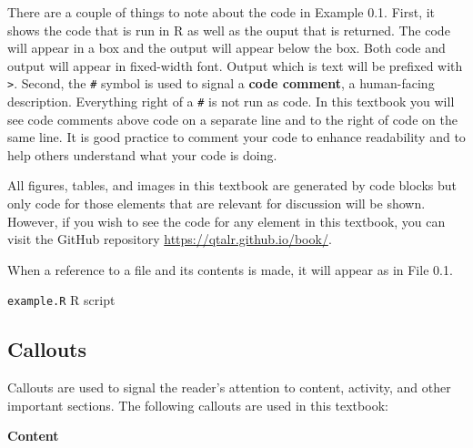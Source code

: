 \documentclass[
  letterpaper,
]{latex/krantz}
\newenvironment{Shaded}{\begin{snugshade}}{\end{snugshade}}
\newcommand{\CommentTok}[1]{\textcolor[rgb]{0.00,0.00,0.00}{\textit{#1}}}
\newcommand{\DecValTok}[1]{\textcolor[rgb]{0.00,0.00,0.00}{#1}}
\newcommand{\FunctionTok}[1]{\textcolor[rgb]{0.00,0.00,0.00}{#1}}
\newcommand{\NormalTok}[1]{\textcolor[rgb]{0.00,0.00,0.00}{#1}}
\newcommand{\SpecialCharTok}[1]{\textcolor[rgb]{0.00,0.00,0.00}{#1}}
\theoremstyle{definition}
\theoremstyle{remark}
\begin{document}
There are a couple of things to note about the code in Example 0.1.
First, it shows the code that is run in R as well as the ouput that is
returned. The code will appear in a box and the output will appear below
the box. Both code and output will appear in fixed-width font. Output
which is text will be prefixed with \texttt{\textgreater{}}. Second, the
\texttt{\#} symbol is used to signal a \textbf{code comment}, a
human-facing description. Everything right of a \texttt{\#} is not run
as code. In this textbook you will see code comments above code on a
separate line and to the right of code on the same line. It is good
practice to comment your code to enhance readability and to help others
understand what your code is doing.

All figures, tables, and images in this textbook are generated by code
blocks but only code for those elements that are relevant for discussion
will be shown. However, if you wish to see the code for any element in
this textbook, you can visit the GitHub repository
\url{https://qtalr.github.io/book/}.

When a reference to a file and its contents is made, it will appear as
in File 0.1.

\begin{codelisting}

\caption{\label{lst-r-code}\texttt{example.R} R script}

\centering{

\begin{Shaded}
\begin{Highlighting}[]
\CommentTok{\# Load libraries}
\FunctionTok{library}\NormalTok{(tidyverse)}

\CommentTok{\# Add 1 and 1}
\DecValTok{1} \SpecialCharTok{+} \DecValTok{1}
\end{Highlighting}
\end{Shaded}

}

\end{codelisting}%

\subsection*{Callouts}\label{sec-p-callouts}

Callouts are used to signal the reader's attention to content, activity,
and other important sections. The following callouts are used in this
textbook:

\textbf{Content}
\end{document}
